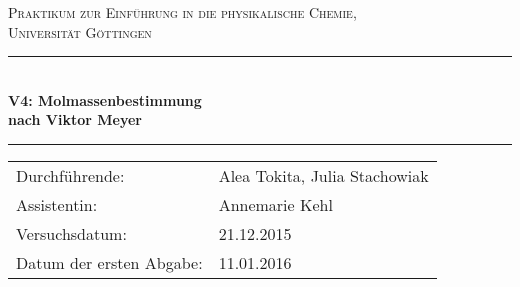 \documentclass[12pt,a4paper,titlepage,headinclude,bibtotoc]{scrartcl}
\begin{document}
\begin{titlepage}
\centering
\textsc{\Large Praktikum zur Einführung in die physikalische Chemie,\\[1.5ex] Universität Göttingen}

\vspace*{2cm}

\rule{\textwidth}{1pt}\\[0.5cm]
{\huge \bfseries
  V4: Molmassenbestimmung\\[1.5ex]
  nach Viktor Meyer}\\[0.5cm]
\rule{\textwidth}{1pt}

\vspace*{1cm}


\begin{Large}
\begin{tabular}{ll}
Durchführende: &  Alea Tokita, Julia Stachowiak\\
Assistentin: & Annemarie Kehl\\
 Versuchsdatum: & 21.12.2015\\
 Datum der ersten Abgabe: & 11.01.2016
\end{tabular}
\end{Large}

\vspace*{2cm}

\begin{Large}
\end{Large}

\end{titlepage}

\tableofcontents

\newpage
\end{document}
